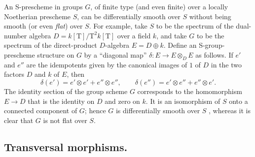 
\begin{remark}[17.12.8]
\label{IV.17.12.8}
An S-prescheme in groups $G$, of finite type (and even finite) over a locally Noetherian prescheme $S$, can be differentially smooth over $S$ without being smooth (or even \emph{flat}) over $S$.
For example, take $S$ to be the spectrum of the dual-number algebra
$D=k[\mathrm{T}]/\mathrm{T}^2k[\mathrm{T}]$ over a field $k$, and take $G$ to be the spectrum of the direct-product $D$-algebra $E=D\oplus k$.
Define an S-group-prescheme structure on $G$ by a ``diagonal map'' $\delta:E\to E\otimes_DE$ as follows.
If $e'$ and $e''$ are the idempotents given by the canonical images of $1$ of $D$ in the two factors $D$ and $k$ of $E$, then
\[
  \delta(e')=e'\otimes e'+e''\otimes e'',\qquad
  \delta(e'')=e'\otimes e''+e''\otimes e'.
\]
The identity section of the group scheme $G$ corresponds to the homomorphism $E\to D$ that is the identity on $D$ and zero on $k$.
It is an isomorphism of $S$ onto a connected component of $G$; hence $G$ is differentially smooth over $S$ , whereas it is clear that $G$ is not flat over $S$.
\end{remark}


\subsection{Transversal morphisms.}
\label{subsection:IV.17.13}

